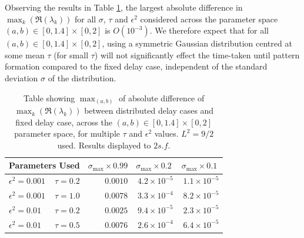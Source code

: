Observing the results in Table \ref{tab:tab1}, the largest absolute difference in $\max_k(\Re(\lambda_k))$ for all $\sigma$, $\tau$ and $\epsilon^2$ considered across the parameter space $(a,b)\in[0,1.4]\times[0,2]$ is $O(10^{-3})$. We therefore expect that for all $(a,b)\in[0,1.4]\times[0,2]$,
using a symmetric Gaussian distribution centred at some mean $\tau$ (for small $\tau$) will not significantly effect the time-taken until pattern formation compared to the fixed delay case, independent of the standard deviation $\sigma$ of the distribution. 

\begin{table}[H]
\centering
\begin{tabular}{lrrrr}
\hline
\multicolumn{2}{c}{Parameters Used}    & $\sigma_{\max}\times0.99$ & $\sigma_{\max}\times0.2\ $ & $\sigma_{\max}\times0.1\ $ \\ \hline
$\epsilon^2=0.001$ & \textbf{$\tau=0.2$} & $0.0010$                           & $4.2\times10^{-5}$                & $1.1\times10^{-5}$                \\
$\epsilon^2=0.001$ & $\tau=1.0$          & $0.0078$                           & $3.3\times10^{-4}$                & $8.2\times10^{-5}$                \\
$\epsilon^2=0.01$  & \textbf{$\tau=0.2$} & $0.0025$                           & $9.4\times10^{-5}$                & $2.3\times10^{-5}$                \\
$\epsilon^2=0.01$  & \textbf{$\tau=0.5$} & \textbf{$0.0076$}                  & $2.6\times10^{-4}$                & $6.4\times10^{-5}$               \\ \hline
\end{tabular}
\caption{Table showing $\max_{(a,b)}$ of absolute difference of $\max_k(\Re(\lambda_k))$ between distributed delay cases and fixed delay case, across the $(a,b)\in[0,1.4]\times[0,2]$ parameter space, for multiple $\tau$ and $\epsilon^2$ values. $L^2=9/2$ used. Results displayed to $2 s.f.$}
\label{tab:tab1}
\end{table}

